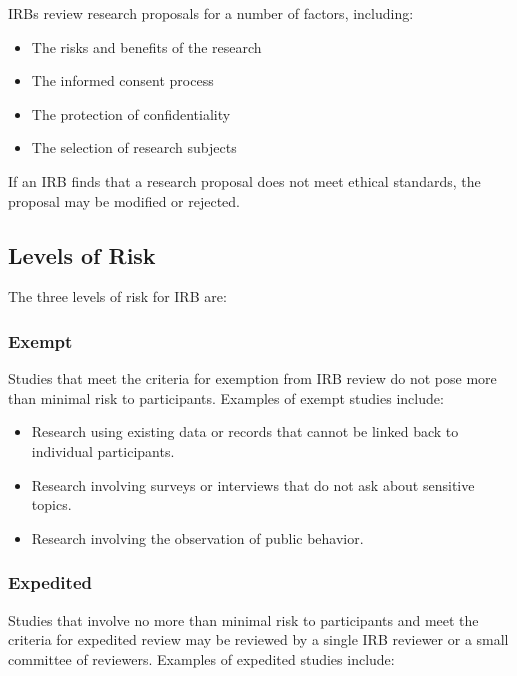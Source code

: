 \documentclass[
  b5paper]{book}
\providecommand{\tightlist}{%
  \setlength{\itemsep}{0pt}\setlength{\parskip}{0pt}}
\begin{document}
IRBs review research proposals for a number of factors, including:

\begin{itemize}
\tightlist
\item
  The risks and benefits of the research
\item
  The informed consent process
\item
  The protection of confidentiality
\item
  The selection of research subjects
\end{itemize}

If an IRB finds that a research proposal does not meet ethical standards, the proposal may be modified or rejected.

\hypertarget{levels-of-risk}{%
\subsection*{Levels of Risk}\label{levels-of-risk}}

The three levels of risk for IRB are:

\hypertarget{exempt}{%
\subsubsection*{Exempt}\label{exempt}}

Studies that meet the criteria for exemption from IRB review do not pose more than minimal risk to participants. Examples of exempt studies include:

\begin{itemize}
\item
  Research using existing data or records that cannot be linked back to individual participants.
\item
  Research involving surveys or interviews that do not ask about sensitive topics.
\item
  Research involving the observation of public behavior.
\end{itemize}

\hypertarget{expedited}{%
\subsubsection*{Expedited}\label{expedited}}

Studies that involve no more than minimal risk to participants and meet the criteria for expedited review may be reviewed by a single IRB reviewer or a small committee of reviewers. Examples of expedited studies include:
\end{document}
